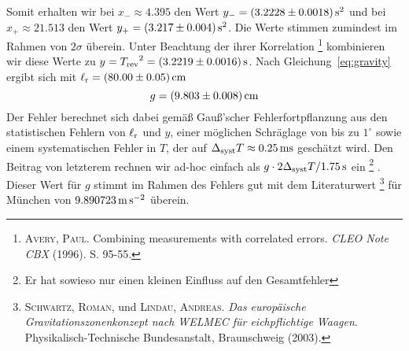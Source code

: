 Somit erhalten wir bei $x_- \approx 4.395$ den Wert $y_- = \unit[(3.2228 \pm 0.0018)]{s^2}$ und bei $x_+ \approx 21.513$ den Wert $y_+ = \unit[(3.217 \pm 0.004)]{s^2}$. Die Werte stimmen zumindest im Rahmen von $2 \sigma$ überein. Unter Beachtung der ihrer Korrelation%
\footnote{\textsc{Avery, Paul}. Combining measurements with correlated errors. \textit{CLEO Note CBX} (1996). S. 95-55.}
kombinieren wir diese Werte zu $y = {T_\mathrm{rev}}^2 = \unit[(3.2219 \pm 0.0016)]{s}$.
Nach Gleichung~\ref{eq:gravity} ergibt sich mit $\l_\mathrm{r} = \unit[(80.00 \pm 0.05)]{cm}$
\[
    g = \unit[(9.803 \pm 0.008)]{cm}
\]
Der Fehler berechnet sich dabei gemäß Gauß'scher Fehlerfortpflanzung aus den statistischen Fehlern von $\ell_\mathrm{r}$ und $y$, einer möglichen Schräglage von bis zu $1^\circ$ sowie einem systematischen Fehler in $T$, der auf $\Delta_\mathrm{syst} T \approx \unit[0.25]{ms}$ geschätzt wird. Den Beitrag von letzterem rechnen wir ad-hoc einfach als $g \cdot 2 \Delta_\mathrm{syst} T / \unit[1.75]{s}$ ein%
\footnote{Er hat sowieso nur einen kleinen Einfluss auf den Gesamtfehler}%
. Dieser Wert für $g$ stimmt im Rahmen des Fehlers gut mit dem Literaturwert%
\footnote{\textsc{Schwartz, Roman}, und \textsc{Lindau, Andreas}. \textit{Das europäische Gravitationszonenkonzept nach WELMEC für eichpflichtige Waagen}. Physikalisch-Technische Bundesanstalt, Braunschweig (2003).}
für München von $\unit[9.890723]{m\,s^{-2}}$ überein.

